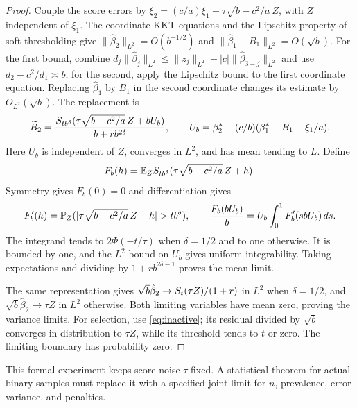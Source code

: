 \begin{proof}
 Couple the score errors by $\xi_2 = (c/a)\xi_1 + \tau\sqrt{b - c^2/a}\,Z$, with
 $Z$ independent of $\xi_1$. The coordinate KKT equations and the Lipschitz
 property of soft-thresholding give $\|\hat\beta_2\|_{L^2} = O(b^{-1/2})$ and
 $\|\hat\beta_1 - B_1\|_{L^2} = O(\sqrt b)$. For the first bound, combine
 $d_j\|\hat\beta_j\|_{L^2} \le \|z_j\|_{L^2} + |c|\|\hat\beta_{3-j}\|_{L^2}$ and
 use $d_2 - c^2/d_1 \asymp b$; for the second, apply the Lipschitz bound to the
 first coordinate equation. Replacing $\hat\beta_1$ by $B_1$ in the second
 coordinate changes its estimate by $O_{L^2}(\sqrt b)$. The replacement is
 \[
  \widetilde B_2 = \frac{S_{tb^\delta}(\tau\sqrt{b - c^2/a}\,Z + bU_b)}{b + rb^{2\delta}}, \qquad U_b
                 = \beta_2^* + (c/b)(\beta_1^* - B_1 + \xi_1/a).
 \]
 Here $U_b$ is independent of $Z$, converges in $L^2$, and has mean tending to
 $L$. Define
 \[
  F_b(h) = \mathbb{E}_ZS_{tb^\delta}(\tau\sqrt{b - c^2/a}\,Z + h).
 \]
 Symmetry gives $F_b(0) = 0$ and differentiation gives
 \[
  F_b'(h) = \mathbb{P}_Z(|\tau\sqrt{b - c^2/a}\,Z + h| > tb^\delta),\qquad \frac{F_b(bU_b)}b
          = U_b\int_0^1F_b'(sbU_b)\,ds.
 \]
 The integrand tends to $2\Phi(-t/\tau)$ when $\delta = 1/2$ and to one
 otherwise. It is bounded by one, and the $L^2$ bound on $U_b$ gives uniform
 integrability. Taking expectations and dividing by $1 + rb^{2\delta-1}$ proves
 the mean limit.

 The same representation gives $\sqrt b\hat\beta_2 \to S_t(\tau Z)/(1 + r)$
 in $L^2$ when $\delta = 1/2$, and $\sqrt b\hat\beta_2 \to \tau Z$ in $L^2$
 otherwise. Both limiting variables have mean zero, proving the variance limits.
 For selection, use \eqref{eq:inactive}; its residual divided by $\sqrt b$
 converges in distribution to $\tau Z$, while its threshold tends to $t$ or
 zero. The limiting boundary has probability zero.
\end{proof}
This formal experiment keeps score noise $\tau$ fixed. A statistical theorem for
actual binary samples must replace it with a specified joint limit for $n$,
prevalence, error variance, and penalties.
